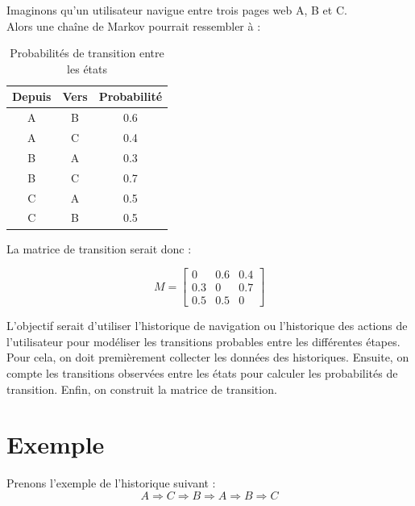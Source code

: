 \documentclass[a4paper, 11pt]{report}
\begin{document}
Imaginons qu'un utilisateur navigue entre trois pages web A, B et C. \\
Alors une chaîne de Markov pourrait ressembler à :


\begin{table}[h!]
	\centering
	\begin{tabular}{|c|c|c|}
		\hline
		\textbf{Depuis} & \textbf{Vers} & \textbf{Probabilité} \\
		\hline
		A               & B             & 0.6                  \\
		A               & C             & 0.4                  \\
		B               & A             & 0.3                  \\
		B               & C             & 0.7                  \\
		C               & A             & 0.5                  \\
		C               & B             & 0.5                  \\
		\hline
	\end{tabular}
	\caption{Probabilités de transition entre les états}
\end{table}


\newpage
La matrice de transition serait donc :

\[
	M =
	\begin{bmatrix}
		0   & 0.6 & 0.4 \\
		0.3 & 0   & 0.7 \\
		0.5 & 0.5 & 0
	\end{bmatrix}
\]


L'objectif serait d'utiliser l'historique de navigation ou l'historique des actions de l'utilisateur pour modéliser les transitions probables entre les différentes étapes. \\
Pour cela, on doit premièrement collecter les données des historiques. Ensuite, on compte les transitions observées entre les états pour calculer les probabilités de transition. Enfin, on construit la matrice de transition.

\section{Exemple}

\noindent{}Prenons l'exemple de l'historique suivant :
\[
	A \Longrightarrow C \Longrightarrow B \Longrightarrow A \Longrightarrow B \Longrightarrow C
\]
\end{document}
